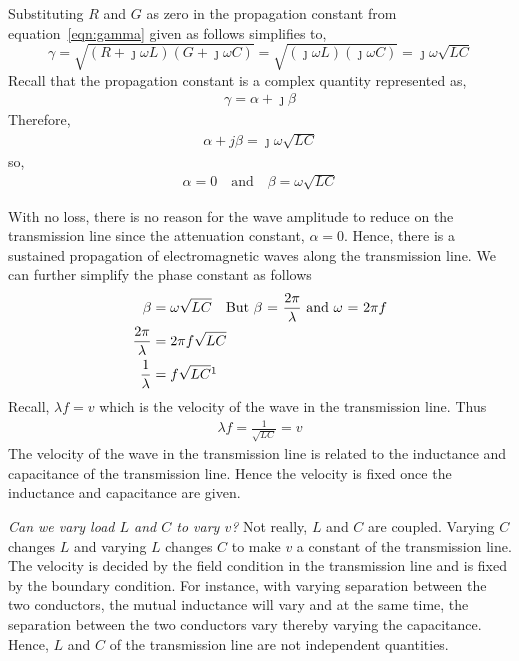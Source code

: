 Substituting $R$ and $G$ as zero in the propagation constant from equation~\eqref{eqn:gamma} given as follows simplifies to,
\begin{dmath*}
\gamma = \sqrt{(R + \jmath\omega L)(G + \jmath\omega C)}
= \sqrt{(\jmath\omega L)(\jmath\omega C)}
= \jmath\omega\sqrt{LC}
\end{dmath*}
Recall that the propagation constant is a complex quantity represented as,
\begin{align*}
\gamma = \alpha + \jmath\beta
\end{align*} 
Therefore,
\begin{align*}
\alpha + j\beta = \jmath\omega\sqrt{LC}
\end{align*}
so,
\begin{align*}
\alpha = 0\quad\text{and}\quad\beta = \omega\sqrt{LC}
\end{align*}

With no loss, there is no reason for the wave amplitude to reduce on the transmission line since the attenuation constant, $\alpha = 0$. Hence, there is a sustained propagation of electromagnetic waves along the transmission line. We can further simplify the phase constant as follows
\begin{align*}
\beta &= \omega\sqrt{LC}\quad\text{But }\beta\text{ = }\frac{2\pi}{\lambda}\text{ and }\omega\text{ = }2\pi f\\
\frac{2\pi}{\lambda} &= 2\pi f\sqrt{LC}\\
\frac{1}{\lambda} &= f\sqrt{LC}\footnotemark
\end{align*}
Recall, $\lambda f = v$ which is the velocity of the wave in the transmission line. Thus
\begin{align*}
\lambda f = \frac{1}{\sqrt{LC}} = v
\end{align*}
The velocity of the wave in the transmission line is related to the inductance and capacitance of the transmission line. Hence the velocity is fixed once the inductance and capacitance are given.

\emph{Can we vary load $L$ and $C$ to vary $v$?} Not really, $L$ and $C$ are coupled. Varying $C$ changes $L$ and varying $L$ changes $C$ to make $v$ a constant of the transmission line. The velocity is decided by the field condition in the transmission line and is fixed by the boundary condition. For instance, with varying separation between the two conductors, the mutual inductance will vary and at the same time, the separation between the two conductors vary thereby varying the capacitance. Hence, $L$ and $C$ of the transmission line are not independent quantities.


